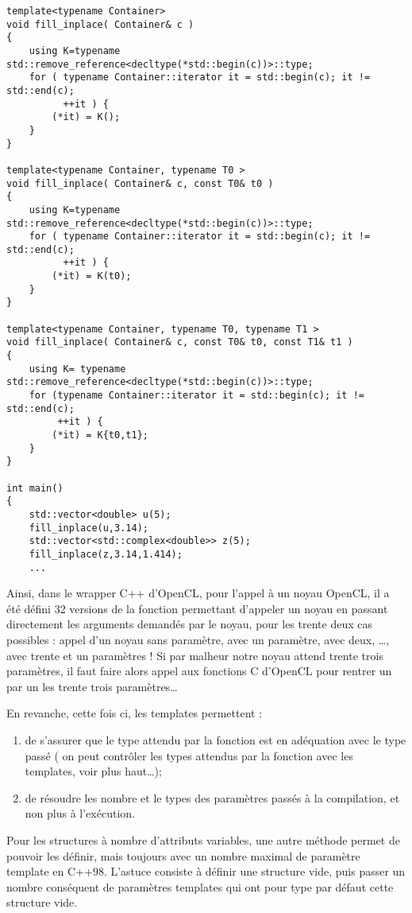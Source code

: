 \documentclass[a4]{article}
\begin{document}
\lstset{style=smaller}

\begin{lstlisting}
template<typename Container> 
void fill_inplace( Container& c ) 
{
    using K=typename std::remove_reference<decltype(*std::begin(c))>::type; 
    for ( typename Container::iterator it = std::begin(c); it != std::end(c); 
          ++it ) {
        (*it) = K();
    }
}

template<typename Container, typename T0 > 
void fill_inplace( Container& c, const T0& t0 )
{
    using K=typename std::remove_reference<decltype(*std::begin(c))>::type; 
    for ( typename Container::iterator it = std::begin(c); it != std::end(c); 
          ++it ) {
        (*it) = K(t0);
    }
}

template<typename Container, typename T0, typename T1 > 
void fill_inplace( Container& c, const T0& t0, const T1& t1 )
{
    using K= typename std::remove_reference<decltype(*std::begin(c))>::type; 
    for (typename Container::iterator it = std::begin(c); it != std::end(c); 
         ++it ) {
        (*it) = K{t0,t1};
    }
}

int main()
{
    std::vector<double> u(5);
    fill_inplace(u,3.14);
    std::vector<std::complex<double>> z(5);
    fill_inplace(z,3.14,1.414);
    ...
\end{lstlisting}

Ainsi, dans le wrapper C++ d'OpenCL, pour l'appel à un noyau OpenCL, il a été défini 32  versions de la fonction permettant d'appeler un noyau en passant directement les arguments demandés par le noyau,
pour les trente deux cas possibles : appel d'un noyau sans paramètre, avec un paramètre, avec deux, \ldots, avec trente et un paramètres !
Si par malheur notre noyau attend trente trois paramètres, il faut faire alors appel aux fonctions C d'OpenCL pour rentrer un par un
les trente trois paramètres\ldots

En revanche, cette fois ci, les templates permettent :
\begin{enumerate}
\item de s'assurer que le type attendu par la fonction est en adéquation avec le type passé ( on peut contrôler les types attendus par la fonction avec les templates, voir plus haut\ldots );
\item de résoudre les nombre et le types des paramètres passés à la compilation, et non plus à l'exécution.
\end{enumerate}

Pour les structures à nombre d'attributs variables, une autre méthode permet de pouvoir les définir, mais toujours avec un nombre
maximal de paramètre template en C++98. L'astuce consiste à définir une structure vide, puis passer un nombre conséquent de paramètres templates qui ont pour type par  défaut cette structure vide.
\end{document}
